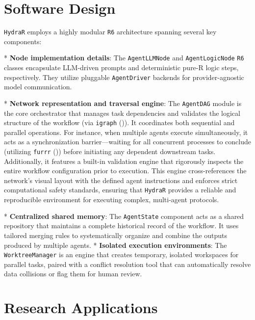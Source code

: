 \documentclass[
]{article}
\begin{document}
\section{Software Design}\label{software-design}

\texttt{HydraR} employs a highly modular \texttt{R6} architecture
spanning several key components: 

* \textbf{Node implementation details}: The \texttt{AgentLLMNode} and \texttt{AgentLogicNode} \texttt{R6} classes encapsulate LLM-driven prompts and deterministic pure-R logic steps, respectively. They utilize pluggable \texttt{AgentDriver} backends for provider-agnostic model communication.

* \textbf{Network representation and traversal engine}: The \texttt{AgentDAG} module is the core orchestrator that manages task dependencies and validates the logical structure of the workflow (via \texttt{igraph} ()). It coordinates both sequential and parallel operations. For instance, when multiple agents execute simultaneously, it acts as a synchronization barrier---waiting for all concurrent processes to conclude (utilizing \texttt{furrr} ()) before initiating any dependent downstream tasks. Additionally, it features a built-in validation engine that rigorously inspects the entire workflow configuration prior to execution. This engine cross-references the network's visual layout with the defined agent instructions and enforces strict computational safety standards, ensuring that \texttt{HydraR} provides a reliable and reproducible environment for executing complex, multi-agent protocols.

* \textbf{Centralized shared memory}: The \texttt{AgentState} component acts as a shared repository that maintains a complete historical record of the workflow. It uses tailored merging rules to systematically organize and combine the outputs produced by multiple agents.
* \textbf{Isolated execution environments}: The \texttt{WorktreeManager} is an engine that creates temporary, isolated workspaces for parallel tasks, paired with a conflict resolution tool that can automatically resolve data collisions or flag them for human review.

\section{Research Applications}\label{research-applications}
\end{document}
